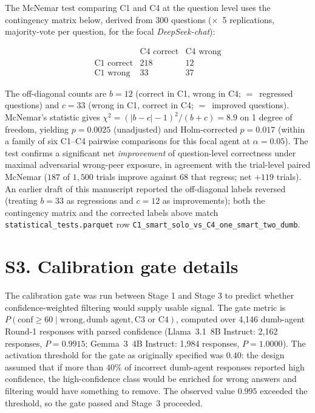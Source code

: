 \documentclass[11pt]{article}
\begin{document}
The McNemar test comparing C1 and C4 at the question level uses the
contingency matrix below, derived from 300 questions ($\times$~5
replications, majority-vote per question, for the focal
\textit{DeepSeek-chat}):

\[
\begin{array}{l|cc}
                & \text{C4 correct} & \text{C4 wrong} \\
\hline
\text{C1 correct} & 218 & 12 \\
\text{C1 wrong}   & 33  & 37
\end{array}
\]

The off-diagonal counts are $b = 12$ (correct in C1, wrong in C4;
$=$~regressed questions) and $c = 33$ (wrong in C1, correct in C4;
$=$~improved questions).
McNemar's statistic gives $\chi^2 = (|b - c| - 1)^2 / (b + c) = 8.9$ on
1 degree of freedom, yielding $p = 0.0025$ (unadjusted) and
Holm-corrected $p = 0.017$ (within a family of six C1--C4 pairwise
comparisons for this focal agent at $\alpha = 0.05$).
The test confirms a significant net \emph{improvement} of
question-level correctness under maximal adversarial wrong-peer
exposure, in agreement with the trial-level paired McNemar
($187$ of $1{,}500$ trials improve against $68$ that regress; net
$+119$ trials).
An earlier draft of this manuscript reported the off-diagonal
labels reversed (treating $b = 33$ as regressions and $c = 12$ as
improvements); both the contingency matrix and the corrected labels
above match \texttt{statistical\_tests.parquet} row
\texttt{C1\_smart\_solo\_vs\_C4\_one\_smart\_two\_dumb}.

\section*{S3. Calibration gate details}
\label{ssec:calibration}

The calibration gate was run between Stage 1 and Stage 3 to predict
whether confidence-weighted filtering would supply usable signal.
The gate metric is
$P(\text{conf} \geq 60 \mid \text{wrong}, \text{dumb agent}, \text{C3
or C4})$, computed over 4{,}146 dumb-agent Round-1 responses with
parsed confidence (Llama~3.1~8B Instruct: 2{,}162 responses,
$P = 0.9915$; Gemma~3~4B Instruct: 1{,}984 responses, $P = 1.0000$).
The activation threshold for the gate as originally specified was
$0.40$: the design assumed that if more than $40\%$ of incorrect
dumb-agent responses reported high confidence, the high-confidence
class would be enriched for wrong answers and filtering would have
something to remove.
The observed value $0.995$ exceeded the threshold, so the gate passed
and Stage~3 proceeded.
\end{document}

